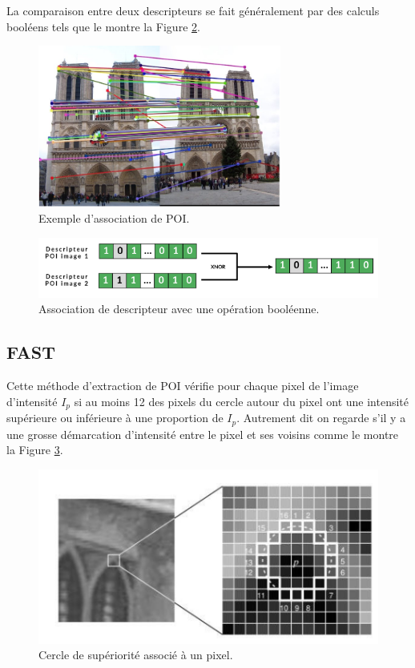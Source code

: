 \documentclass[11pt]{article}
\begin{document}
      La comparaison entre deux descripteurs se fait généralement par des calculs booléens tels que le montre la 
      Figure \ref{fig:Descripteur}.

      \begin{figure}[hbt]  
        \centering
        \includegraphics[width=80mm]{AssociationPOI.png}    
        \caption{Exemple d'association de POI.}
        \label{fig:Appariement}
      \end{figure} 
      
      \begin{figure}[hbt]  
        \includegraphics[width=\textwidth]{CalculsDescripteurs.png}    
        \caption{Association de descripteur avec une opération booléenne.}
        \label{fig:Descripteur}
      \end{figure} 

    \subsection*{FAST}
      Cette méthode d'extraction de POI vérifie pour chaque pixel de l'image d'intensité $I_p$ si au moins 12 des pixels
      du cercle autour du pixel ont une intensité supérieure ou inférieure à une proportion de $I_p$. Autrement dit on regarde s’il y a une 
      grosse démarcation d'intensité entre le pixel et ses voisins comme le montre la Figure \ref{fig:CercleSuperiorite}.

      \begin{figure}[hbt]  
        \includegraphics[width=\textwidth]{CercleSuperiorite.png}    
        \caption{Cercle de supériorité associé à un pixel.}
        \label{fig:CercleSuperiorite}
      \end{figure}
\end{document}
